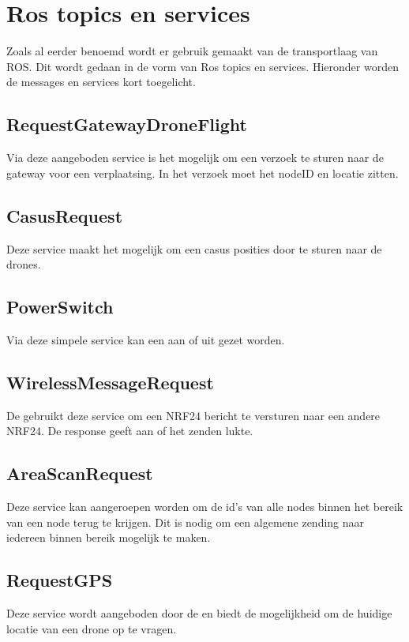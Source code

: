 \documentclass[a4paper, 11pt, oneside]{report}
\begin{document}
\section{Ros topics en services}
\label{architectural:ros}
Zoals al eerder benoemd wordt er gebruik gemaakt van de transportlaag van ROS. Dit wordt gedaan in de vorm van Ros topics en services. Hieronder worden de messages en services kort toegelicht.
\subsection{RequestGatewayDroneFlight}
\label{architectural:ros:service:RequestGatewayDroneFlight}
Via deze aangeboden service is het mogelijk om een verzoek te sturen naar de gateway voor een verplaatsing. In het verzoek moet het nodeID en locatie zitten.


\subsection{CasusRequest}
\label{architectural:ros:service:CasusRequest}
Deze service maakt het mogelijk om een casus posities door te sturen naar de drones.

\subsection{PowerSwitch}
\label{architectural:ros:service:PowerSwitch}
Via deze simpele service kan een  aan of uit gezet worden.

\subsection{WirelessMessageRequest}
\label{architectural:ros:service:WirelessMessageRequest}
De  gebruikt deze service om een NRF24 bericht te versturen naar een andere NRF24. De response geeft aan of het zenden lukte.

\subsection{AreaScanRequest}
\label{architectural:ros:service:AreaScanRequest}
Deze service kan aangeroepen worden om de id's van alle nodes binnen het bereik van een node terug te krijgen. 
Dit is nodig om een algemene zending naar iedereen binnen bereik mogelijk te maken.

\subsection{RequestGPS}
\label{architectural:ros:service:RequestGPS}
Deze service wordt aangeboden door de  en biedt de mogelijkheid om de huidige locatie van een drone op te vragen. 
\end{document}
